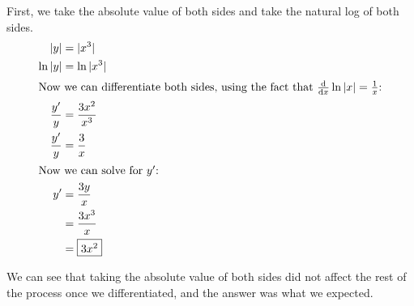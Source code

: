 \documentclass[main]{subfiles}
\begin{document}
\begin{enumerate}[resume]
\begin{enumerate}
\begin{solution}
    First, we take the absolute value of both sides and take the natural log of both sides.
    \begin{align*}
        |y| &= |x^3| \\
        \ln|y| &= \ln|x^3|\\
        \intertext{Now we can differentiate both sides, using the fact that $\diff*{\ln|x|}{x}=\frac{1}{x}$:}
        \frac{y'}{y} &= \frac{3x^2}{x^3} \\
        \frac{y'}{y} &= \frac{3}{x} \\
        \intertext{Now we can solve for $y'$:}
        y' &= \frac{3y}{x} \\
        &= \frac{3x^3}{x} \\
        &= \fbox{$3x^2$}
    \end{align*}
\end{solution}
We can see that taking the absolute value of both sides did not affect the rest of the process once we differentiated, and the answer was what we expected.
\end{enumerate}

\end{enumerate}
\end{document}
